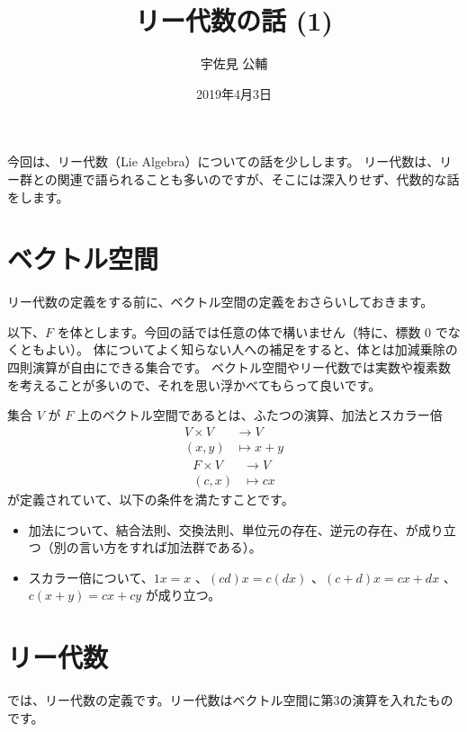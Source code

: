 \documentclass{ltjsarticle}
\title{リー代数の話 (1)}
\author{宇佐見 公輔}
\date{2019年4月3日}
\begin{document}
\maketitle

今回は、リー代数（Lie Algebra）についての話を少しします。
リー代数は、リー群との関連で語られることも多いのですが、そこには深入りせず、代数的な話をします。

\section{ベクトル空間}

リー代数の定義をする前に、ベクトル空間の定義をおさらいしておきます。

以下、\(F\) を体とします。今回の話では任意の体で構いません（特に、標数 \(0\) でなくともよい）。
体についてよく知らない人への補足をすると、体とは加減乗除の四則演算が自由にできる集合です。
ベクトル空間やリー代数では実数や複素数を考えることが多いので、それを思い浮かべてもらって良いです。

\begin{definition}[ベクトル空間]
    集合 \(V\) が \(F\) 上のベクトル空間であるとは、ふたつの演算、加法とスカラー倍
    \begin{align*}
        V \times V & \to V         \\
        (x, y)     & \mapsto x + y
    \end{align*}
    \begin{align*}
        F \times V & \to V      \\
        (c, x)     & \mapsto cx
    \end{align*}
    が定義されていて、以下の条件を満たすことです。
    \begin{itemize}
        \item 加法について、結合法則、交換法則、単位元の存在、逆元の存在、が成り立つ（別の言い方をすれば加法群である）。
        \item スカラー倍について、\(1x = x\) 、\((cd)x = c(dx)\) 、\((c + d)x = cx + dx\) 、\(c(x + y) = cx + cy\)
              が成り立つ。
    \end{itemize}
\end{definition}

\section{リー代数}

では、リー代数の定義です。リー代数はベクトル空間に第3の演算を入れたものです。
\end{document}
